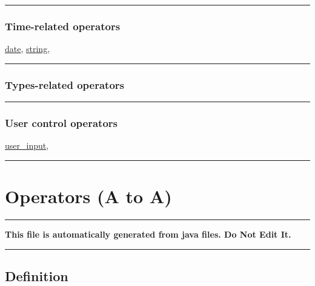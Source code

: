 \documentclass[]{book}
\theoremstyle{definition}
\theoremstyle{definition}
\theoremstyle{definition}
\theoremstyle{remark}
\begin{document}
\begin{center}\rule{0.5\linewidth}{\linethickness}\end{center}

\subsection{Time-related operators}\label{time-related-operators}

\href{operators-d-to-h.html\#date}{date},
\href{operators-s-to-z.html\#string}{string},

\begin{center}\rule{0.5\linewidth}{\linethickness}\end{center}

\subsection{Types-related operators}\label{types-related-operators}

\begin{center}\rule{0.5\linewidth}{\linethickness}\end{center}

\subsection{User control operators}\label{user-control-operators}

\href{operators-s-to-z.html\#user_input}{user\_input},

\begin{center}\rule{0.5\linewidth}{\linethickness}\end{center}

\chapter{Operators (A to A)}\label{operators-a-to-a}

\begin{center}\rule{0.5\linewidth}{\linethickness}\end{center}

\textbf{This file is automatically generated from java files. Do Not
Edit It.}

\begin{center}\rule{0.5\linewidth}{\linethickness}\end{center}

\section{Definition}\label{definition}
\end{document}
